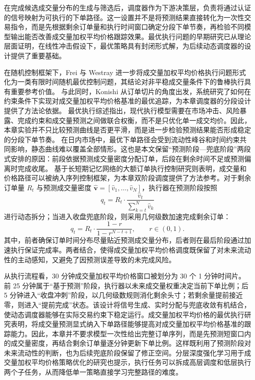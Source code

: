 在完成候选成交量分布的生成与筛选后，调度器作为下游决策层，负责将通过认证的信号映射为可执行的下单路径\cite{bertsimas1998optimal}。这一设置并不是将预测结果直接转化为一次性交易指令，而是先根据剩余订单量和执行时间窗口确定分段下单节奏，再检验不同模型输出能否改善成交量加权平均价格跟踪效果。最优执行问题的早期研究已从理论层面证明，在线性冲击假设下，最优策略具有封闭形式解，为后续动态调度器的设计提供了重要基础\cite{cartea2016closed}。

在随机控制框架下，Frei 与 Westray 进一步将成交量加权平均价格执行问题形式化为一类有限时间随机最优控制问题，其结论对非平稳成交量条件下的鲁棒执行具有重要参考价值\cite{frei2015optimal}。
与此同时，Konishi 从订单切片的角度出发，系统研究了如何在约束条件下实现对成交量加权平均价格基准的最优追踪，为本章调度器的分段设计提供了方法论依据\cite{konishi2002optimal}。
最优执行综述指出，现代执行模型需要在市场冲击、风险暴露、完成约束和成交量预测之间做联合权衡，而不是只优化单一成交均价\cite{gatheral2022optimal}。因此，本章实验并不只比较预测曲线是否更平滑，而是进一步检验预测结果能否形成稳定的分段下单节奏。
在日内市场中，最优下单路径会受到流动性峰谷和时间约束共同影响，静态曲线难以覆盖全部情形\cite{kath2020optimal}。这也是本文保留“预测阶段—兜底阶段”两段式安排的原因：前段依据预测成交量密度分配订单，后段在剩余时间不足或预测偏离时完成收尾。
基于长短期记忆网络的大额订单执行控制研究则表明，成交量和价格路径可以被纳入序列控制框架，为本章双阶段调度提供了方法参考\cite{papanicolaou2023optimal}。对于剩余订单量 $R_t$ 与预测成交量密度 $\hat{\mathbf{v}}=[\hat{v}_1,\dots,\hat{v}_N]$，执行器在预测阶段按照
\begin{equation}
q_t = R_t \cdot \frac{\hat{v}_t}{\sum_{k=t}^{N} \hat{v}_k}
\label{eq:dynamic_schedule_new}
\end{equation}
进行动态拆分；当进入收盘兜底阶段，则采用几何级数加速完成剩余订单：
\begin{equation}
q_t = R_t \cdot \frac{1-r}{1-r^{N-t+1}}, \qquad r\in(0,1).
\label{eq:closing_phase_new}
\end{equation}
其中，前者确保订单时间分布尽量贴近预测成交量分布，后者则在最后阶段通过加速执行保证完成率。两者结合，使得成交量加权平均价格调度既保留了对未来流动性的主动感知，又避免了因预测误差导致的未完成风险。

从执行流程看，30 分钟成交量加权平均价格窗口被划分为 30 个 1 分钟时间片。前 25 分钟属于“基于预测”阶段，执行器以未来成交量权重决定当前下单比例；后 5 分钟进入“收盘冲刺”阶段，以几何级数规则消化剩余头寸；若剩余量提前接近零，则进入“提前完成”状态。该设计将信号生成、实时分配与兜底收敛有机结合，使动态调度器能够在实际交易约束下稳定运行。成交量加权平均价格的最优执行研究表明，将成交量预测显式纳入下单路径能够提高对成交量加权平均价格基准的跟踪能力\cite{busseti2015volume}。因此，本章并不要求模型一次性给出完整订单序列，而是先预测短窗口内的成交量密度，再结合剩余订单量逐分钟更新下单比例。这样既利用了预测阶段对未来流动性的判断，也为后续兜底阶段保留了修正空间。分层深度强化学习用于成交量加权平均价格策略优化的研究也提示，执行任务可以拆成高层调度和低层执行两个子任务，从而降低单一策略直接学习完整路径的难度\cite{10336391}。

